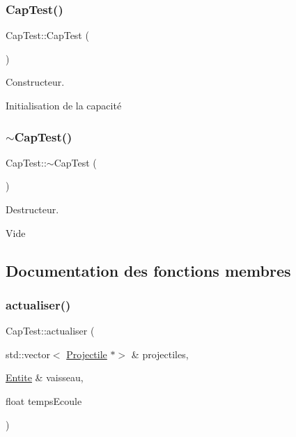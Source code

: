 \subsubsection{\texorpdfstring{Cap\+Test()}{CapTest()}}
{\footnotesize\ttfamily Cap\+Test\+::\+Cap\+Test (\begin{DoxyParamCaption}{ }\end{DoxyParamCaption})}



Constructeur. 

Initialisation de la capacité \mbox{\label{class_cap_test_a92687aa212347d1738e7736cb107d03b}} 
\subsubsection{\texorpdfstring{$\sim$\+Cap\+Test()}{~CapTest()}}
{\footnotesize\ttfamily Cap\+Test\+::$\sim$\+Cap\+Test (\begin{DoxyParamCaption}{ }\end{DoxyParamCaption})}



Destructeur. 

Vide 

\subsection{Documentation des fonctions membres}
\mbox{\label{class_cap_test_a082e76e397a400b9c46e13e63ac7ef85}} 
\subsubsection{\texorpdfstring{actualiser()}{actualiser()}}
{\footnotesize\ttfamily Cap\+Test\+::actualiser (\begin{DoxyParamCaption}\item[{std\+::vector$<$ \hyperlink{class_projectile}{Projectile} $\ast$$>$ \&}]{projectiles,  }\item[{\hyperlink{class_entite}{Entite} \&}]{vaisseau,  }\item[{float}]{temps\+Ecoule }\end{DoxyParamCaption})\hspace{0.3cm}{\ttfamily [virtual]}}



